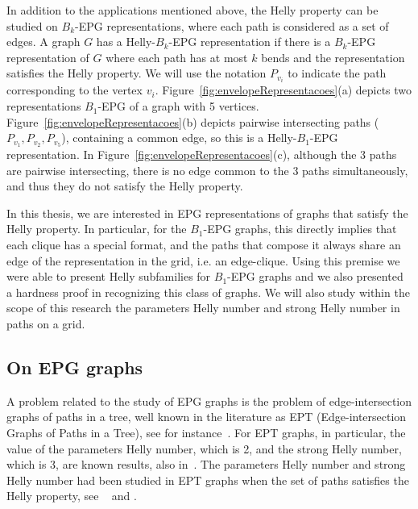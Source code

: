 In addition to the applications mentioned above, the Helly property can be studied on  $ B_k$-EPG representations, where each path is considered as a set of edges. A  graph $ G $ has a Helly-$B_k$-EPG representation if there is a $ B_k$-EPG representation of $ G $ where each path has at most $ k $ bends and the representation satisfies the Helly property.
We will use the  notation $ P_{v_i} $ to indicate the path corresponding to the  vertex $ v_i$.
Figure~\ref{fig:envelopeRepresentacoes}(a) depicts two representations $ B_1$-EPG of a graph with 5 vertices. Figure~\ref{fig:envelopeRepresentacoes}(b) depicts pairwise intersecting paths ($ P_{v_1}, P_{v_2}, P_{v_5} $), containing a common edge, so this is a  Helly-$B_1$-EPG representation. In Figure~\ref{fig:envelopeRepresentacoes}(c), although the 3 paths are pairwise intersecting, there is no edge common to the 3 paths simultaneously, and thus they do not satisfy the Helly property.



In this thesis, we are interested in EPG representations of graphs that satisfy the Helly property. In particular, for the $ B_1$-EPG graphs, this directly implies that each clique has a special format, and the paths that compose it always share an edge of the representation in the grid, i.e. an edge-clique. Using this premise we were able to present Helly subfamilies for $ B_1$-EPG graphs and we also presented a hardness proof  in recognizing this class of graphs.
 We will also study within the scope of this research the parameters Helly number and strong Helly number in paths on a grid.

\subsection{On EPG graphs}

A problem related to the study of EPG graphs is the problem of edge-intersection graphs of paths in a tree, well known in the literature as EPT (Edge-intersection Graphs of Paths in a Tree), see for instance~\cite{gavril1974intersection, golumbic2004recognition}. For EPT graphs, in particular, the value of the parameters Helly number, which is 2, and the strong Helly  number, which is 3, are known results, also in~\cite{golumbic2004recognition}. The parameters Helly number and strong Helly number had been studied in EPT graphs when the set of paths satisfies the Helly property, see
~\cite{petito2002grafos} and \cite{petito2009grafos}.

